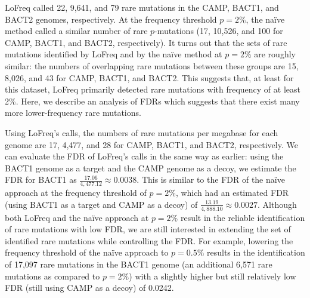 LoFreq called 22, 9,641, and 79 rare mutations in the CAMP, BACT1, and BACT2 genomes, respectively. At the frequency threshold $p = 2\%$, the na\"ive method called a similar number of rare $p$-mutations (17, 10,526, and 100 for CAMP, BACT1, and BACT2, respectively). It turns out that the sets of rare mutations identified by LoFreq and by the na\"ive method at $p = 2\%$ are roughly similar: the numbers of overlapping rare mutations between these groups are 15, 8,026, and 43 for CAMP, BACT1, and BACT2. This suggests that, at least for this dataset, LoFreq primarily detected rare mutations with frequency of at least 2\%. Here, we describe an analysis of FDRs which suggests that there exist many more lower-frequency rare mutations.

Using LoFreq's calls, the numbers of rare mutations per megabase for each genome are 17, 4,477, and 28 for CAMP, BACT1, and BACT2, respectively. We can evaluate the FDR of LoFreq's calls in the same way as earlier: using the BACT1 genome as a target and the CAMP genome as a decoy, we estimate the FDR for BACT1 as $\frac{17.06}{4,477.12} \approx 0.0038$. This is similar to the FDR of the na\"ive approach at the frequency threshold of $p = 2\%$, which had an estimated FDR (using BACT1 as a target and CAMP as a decoy) of $\frac{13.19}{4,888.10} \approx 0.0027$. Although both LoFreq and the na\"ive approach at $p = 2\%$ result in the reliable identification of rare mutations with low FDR, we are still interested in extending the set of identified rare mutations while controlling the FDR. For example, lowering the frequency threshold of the na\"ive approach to $p = 0.5\%$ results in the identification of 17,097 rare mutations in the BACT1 genome (an additional 6,571 rare mutations as compared to $p = 2\%$) with a slightly higher but still relatively low FDR (still using CAMP as a decoy) of 0.0242.\endinput